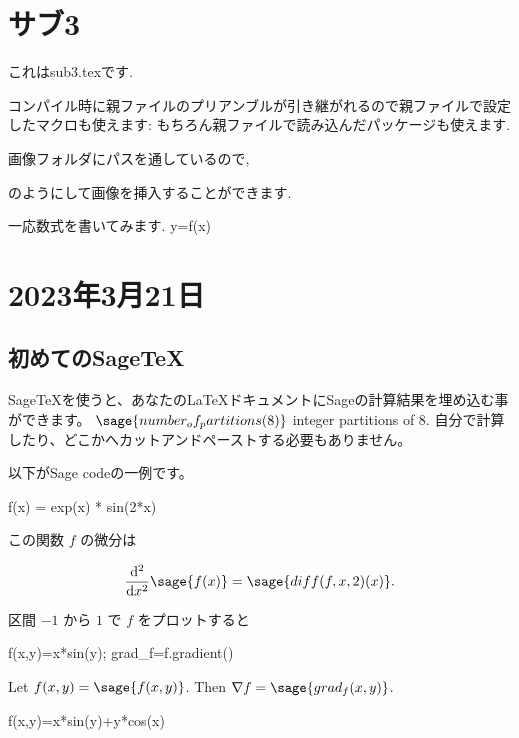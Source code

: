 \documentclass[../master.tex]{subfiles}
\begin{document}
\section{サブ3}
    これはsub3.texです.

    コンパイル時に親ファイルのプリアンブルが引き継がれるので親ファイルで設定したマクロも使えます:
    もちろん親ファイルで読み込んだパッケージも使えます.
    \begin{comment}
        コメント環境
    \end{comment}

    画像フォルダにパスを通しているので,
    \begin{figure}[h]
        \centering
    \end{figure}
    のようにして画像を挿入することができます.

    一応数式を書いてみます.
        y=f(x)

    \section{2023年3月21日}
\subsection{初めてのSage\TeX{}}

Sage\TeX{}を使うと、あなたの\LaTeX{}ドキュメントにSageの計算結果を埋め込む事ができます。
$\sage{number_of_partitions(8)}$ integer partitions of $8$.
自分で計算したり、どこかへカットアンドペーストする必要もありません。

以下がSage codeの一例です。

\begin{sageblock}
    f(x) = exp(x) * sin(2*x)
\end{sageblock}

この関数 $f$ の微分は

\[
    \frac{\mathrm{d}^{2}}{\mathrm{d}x^{2}} \sage{f(x)} =
    \sage{diff(f, x, 2)(x)}.
\]

区間 $-1$ から $1$ で $f$ をプロットすると

\begin{sagesilent}
    f(x,y)=x*sin(y); grad_f=f.gradient()
\end{sagesilent}
Let $f(x,y)=\sage{f(x,y)}$. Then $\nabla f=\sage{grad_f(x,y)}$.

\begin{sagesilent}
    f(x,y)=x*sin(y)+y*cos(x)
\end{sagesilent}


%
%
\end{document}
